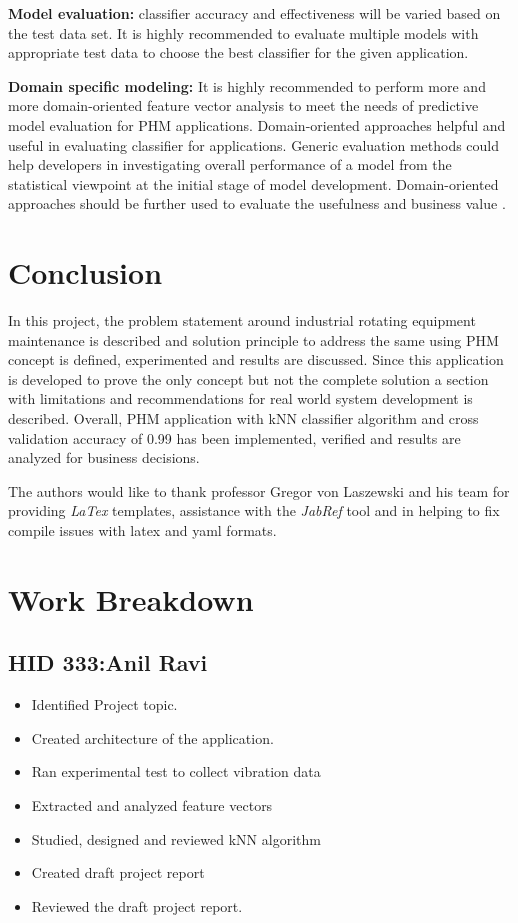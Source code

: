 \documentclass[sigconf]{acmart}
\begin{document}
\textbf{Model evaluation:} classifier accuracy and effectiveness will be varied based on the test data set. It is highly recommended to evaluate multiple models with appropriate test data to choose the best classifier for the given application.

\textbf{Domain specific modeling:} It is highly recommended to perform more and more domain-oriented feature vector analysis to meet the needs of predictive model evaluation for PHM applications. Domain-oriented approaches helpful and useful in evaluating classifier for applications. Generic evaluation methods could help developers in investigating overall performance of a model from the statistical viewpoint at the initial stage of model development. Domain-oriented approaches should be further used to evaluate the usefulness and business value \cite{Yang2014}.  

\section{Conclusion}
In this project, the problem statement around industrial rotating equipment maintenance is described and solution principle to address the same using PHM concept is defined, experimented and results are discussed. Since this application is developed to prove the only concept but not the complete solution a section with limitations and recommendations for real world system development is described. Overall, PHM application with kNN classifier algorithm and cross validation accuracy of 0.99 has been implemented, verified and results are analyzed for business decisions.
\begin{acks}

  The authors would like to thank professor Gregor von Laszewski and his team for providing \textit{LaTex} templates, assistance with the \textit{JabRef} tool and in helping to fix compile issues with latex and yaml formats.

\end{acks}


 
\newpage
\appendix
\section{Work Breakdown}
\subsection{HID 333:Anil Ravi}
\begin{itemize}
  \item Identified Project topic.
  \item Created architecture of the application.
  \item Ran experimental test to collect vibration data
  \item Extracted and analyzed feature vectors
  \item Studied, designed and reviewed kNN algorithm
  \item Created draft project report
  \item Reviewed the draft project report.
  
\end{itemize}
\end{document}
